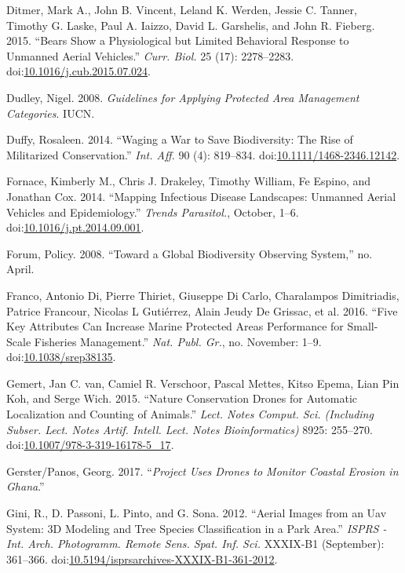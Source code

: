 \documentclass[]{interact}
\theoremstyle{plain}%
\theoremstyle{definition}
\theoremstyle{remark}
\begin{document}
\hypertarget{ref-ditmer_bears_2015}{}
Ditmer, Mark A., John B. Vincent, Leland K. Werden, Jessie C. Tanner,
Timothy G. Laske, Paul A. Iaizzo, David L. Garshelis, and John R.
Fieberg. 2015. ``Bears Show a Physiological but Limited Behavioral
Response to Unmanned Aerial Vehicles.'' \emph{Curr. Biol.} 25 (17):
2278--2283.
doi:\href{https://doi.org/10.1016/j.cub.2015.07.024}{10.1016/j.cub.2015.07.024}.

\hypertarget{ref-dudley_guidelines_2008}{}
Dudley, Nigel. 2008. \emph{Guidelines for Applying Protected Area
Management Categories}. IUCN.

\hypertarget{ref-duffy_waging_2014}{}
Duffy, Rosaleen. 2014. ``Waging a War to Save Biodiversity: The Rise of
Militarized Conservation.'' \emph{Int. Aff.} 90 (4): 819--834.
doi:\href{https://doi.org/10.1111/1468-2346.12142}{10.1111/1468-2346.12142}.

\hypertarget{ref-fornace_mapping_2014}{}
Fornace, Kimberly M., Chris J. Drakeley, Timothy William, Fe Espino, and
Jonathan Cox. 2014. ``Mapping Infectious Disease Landscapes: Unmanned
Aerial Vehicles and Epidemiology.'' \emph{Trends Parasitol.}, October,
1--6.
doi:\href{https://doi.org/10.1016/j.pt.2014.09.001}{10.1016/j.pt.2014.09.001}.

\hypertarget{ref-forum_toward_2008}{}
Forum, Policy. 2008. ``Toward a Global Biodiversity Observing System,''
no. April.

\hypertarget{ref-franco_five_2016}{}
Franco, Antonio Di, Pierre Thiriet, Giuseppe Di Carlo, Charalampos
Dimitriadis, Patrice Francour, Nicolas L Gutiérrez, Alain Jeudy De
Grissac, et al. 2016. ``Five Key Attributes Can Increase Marine
Protected Areas Performance for Small-Scale Fisheries Management.''
\emph{Nat. Publ. Gr.}, no. November: 1--9.
doi:\href{https://doi.org/10.1038/srep38135}{10.1038/srep38135}.

\hypertarget{ref-van_gemert_nature_2015}{}
Gemert, Jan C. van, Camiel R. Verschoor, Pascal Mettes, Kitso Epema,
Lian Pin Koh, and Serge Wich. 2015. ``Nature Conservation Drones for
Automatic Localization and Counting of Animals.'' \emph{Lect. Notes
Comput. Sci. (Including Subser. Lect. Notes Artif. Intell. Lect. Notes
Bioinformatics)} 8925: 255--270.
doi:\href{https://doi.org/10.1007/978-3-319-16178-5_17}{10.1007/978-3-319-16178-5\_17}.

\hypertarget{ref-Georg2016}{}
Gerster/Panos, Georg. 2017. ``\emph{Project Uses Drones to Monitor
Coastal Erosion in Ghana}.''

\hypertarget{ref-gini_aerial_2012}{}
Gini, R., D. Passoni, L. Pinto, and G. Sona. 2012. ``Aerial Images from
an Uav System: 3D Modeling and Tree Species Classification in a Park
Area.'' \emph{ISPRS - Int. Arch. Photogramm. Remote Sens. Spat. Inf.
Sci.} XXXIX-B1 (September): 361--366.
doi:\href{https://doi.org/10.5194/isprsarchives-XXXIX-B1-361-2012}{10.5194/isprsarchives-XXXIX-B1-361-2012}.
\end{document}
